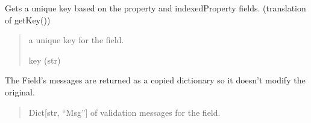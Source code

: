 \documentclass[letterpaper,10pt,english]{sphinxmanual}
\begin{document}
\begin{fulllineitems}
\begin{fulllineitems}
\label{\detokenize{apache_commons_validator_python:apache_commons_validator_python.field_new.Field.key}}
\pysigstartsignatures
{}
\pysigstopsignatures
\sphinxAtStartPar
Gets a unique key based on the property and indexedProperty fields.
(translation of getKey())
\begin{quote}\begin{description}
\sphinxAtStartPar
a unique key for the field.

\sphinxAtStartPar
key (str)

\end{description}\end{quote}

\end{fulllineitems}


\begin{fulllineitems}
\label{\detokenize{apache_commons_validator_python:apache_commons_validator_python.field_new.Field.msgs}}
\pysigstartsignatures
{}
\pysigstopsignatures
\sphinxAtStartPar
The Field’s messages are returned as a copied dictionary so it doesn’t modify
the original.
\begin{quote}\begin{description}
\sphinxAtStartPar
Dict{[}str, “Msg”{]} of validation messages for the field.

\end{description}\end{quote}

\end{fulllineitems}



\end{fulllineitems}
\end{document}
